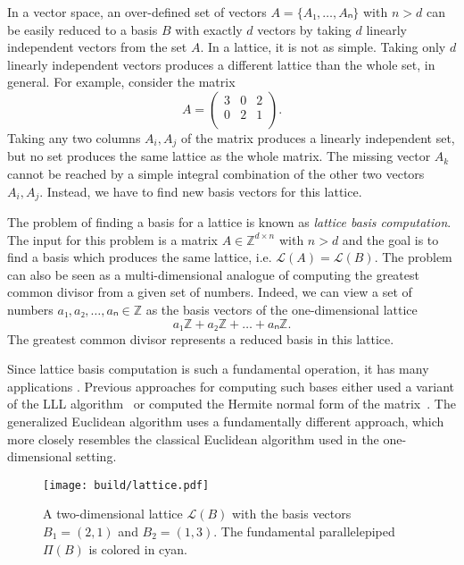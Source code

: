 In a vector space, an over-defined set of vectors $A = \{A₁, …, Aₙ\}$ with $n > d$
can be easily reduced to a basis $B$ with exactly $d$ vectors by taking $d$
linearly independent vectors from the set $A$.
In a lattice, it is not as simple.
Taking only $d$ linearly independent vectors produces a different lattice than
the whole set, in general.
For example, consider the matrix
\[
  A = \begin{pmatrix}
    3 & 0 & 2 \\
    0 & 2 & 1 \\
  \end{pmatrix}.
\]
Taking any two columns $A_i, A_j$ of the matrix produces a linearly independent
set, but no set produces the same lattice as the whole matrix.
The missing vector $A_k$ cannot be reached by a simple integral combination of the
other two vectors $A_i, A_j$.
Instead, we have to find new basis vectors for this lattice.

The problem of finding a basis for a lattice is known as \emph{lattice basis computation}.
The input for this problem is a matrix $A ∈ ℤ^{d×n}$ with $n > d$ and the goal
is to find a basis which produces the same lattice, i.e. $\mathcal L(A) = \mathcal L(B)$.
The problem can also be seen as a multi-dimensional analogue of
computing the greatest common divisor from a given set of numbers.
Indeed, we can view a set of numbers $a₁, a₂, …, aₙ ∈ ℤ$ as the basis vectors
of the one-dimensional lattice
\[
  a₁ℤ + a₂ ℤ + \dots + aₙ ℤ.
\]
The greatest common divisor represents a reduced basis in this lattice.

Since lattice basis computation is such a fundamental operation, it has many
applications \cite{Ajtai96,Gentry08}.
Previous approaches for computing such bases either used a variant of the LLL
algorithm~\cite{Lenstra82} or computed the Hermite normal form of the
matrix~\cite{Storjohann96}.
The generalized Euclidean algorithm uses a fundamentally different approach,
which more closely resembles the classical Euclidean algorithm used in the
one-dimensional setting.

\begin{figure}[tbp]
  \centering
  \texttt{[image: build/lattice.pdf]}
  \caption{
    A two-dimensional lattice $\mathcal L(B)$ with the basis vectors $B_1 = (2,
    1)$ and $B_2 = (1, 3)$. The fundamental parallelepiped $Π(B)$ is colored in
    {\color{cyan}cyan}.
  }
\end{figure}

